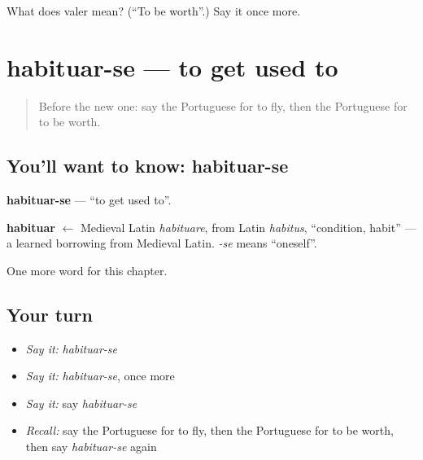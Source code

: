 \begin{tcolorbox}[breakable,colback=teal!4,colframe=teal!35!black,title={Before you move on}]
What does valer mean? (\textquotedblleft{}To be worth\textquotedblright{}.) Say it once more.
\end{tcolorbox}
\section[habituar-se]{habituar-se — to get used to}

\label{lesson:PT-C177-habituar-se}



\begin{quote}
Before the new one: say the Portuguese for to fly, then the Portuguese for to be worth.
\end{quote}

\subsection*{You'll want to know: habituar-se}
\textbf{habituar-se} — \textquotedblleft{}to get used to\textquotedblright{}.

\begin{cousinweb}
\textbf{habituar} $\leftarrow$ Medieval Latin \emph{habituare}, from Latin \emph{habitus}, \textquotedblleft{}condition, habit\textquotedblright{} — a learned borrowing from Medieval Latin. \emph{-se} means \textquotedblleft{}oneself\textquotedblright{}.
\end{cousinweb}

\begin{grammarlens}[title={What you've built}]
One more word for this chapter.
\end{grammarlens}

\subsection*{Your turn}
\begin{itemize}
\raggedright
  \item \emph{Say it:} \emph{habituar-se}
  \item \emph{Say it:} \emph{habituar-se}, once more
  \item \emph{Say it:} say \emph{habituar-se}
  \item \emph{Recall:} say the Portuguese for to fly, then the Portuguese for to be worth, then say \emph{habituar-se} again
\end{itemize}

